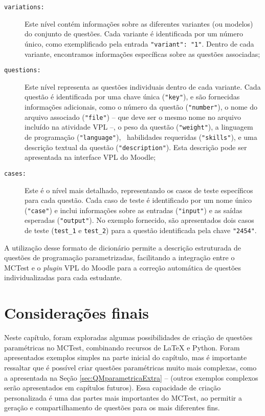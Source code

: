 \begin{description}
\item[\texttt{variations:}]  Este nível contém informações sobre as diferentes variantes (ou modelos) do conjunto de questões. Cada variante é identificada por um número único, como exemplificado pela entrada \verb|"variant": "1"|. Dentro de cada variante, encontramos informações específicas sobre as questões associadas;

\item[\texttt{questions:}] Este nível representa as questões individuais dentro de cada variante. Cada questão é identificada por uma chave única (\verb|"key"|), e são fornecidas informações adicionais, como o número da questão (\verb|"number"|), o nome do arquivo associado (\verb|"file"|) -- que deve ser o mesmo nome no arquivo incluído na atividade VPL --, o peso da questão (\verb|"weight"|), a linguagem de programação (\verb|"language"|), \ habilidades requeridas (\verb|"skills"|), e uma descrição textual da questão (\verb|"description"|). Esta descrição pode ser apresentada na interface VPL do Moodle;

\item[\texttt{cases:}] Este é o nível mais detalhado, representando os casos de teste específicos para cada questão. Cada caso de teste é identificado por um nome único (\verb|"case"|) e inclui informações sobre as entradas (\verb|"input"|) e as saídas esperadas (\verb|"output"|). No exemplo fornecido, são apresentados dois casos de teste (\verb|test_1| e \verb|test_2|) para a questão identificada pela chave \verb|"2454"|.
\end{description}

A utilização desse formato de dicionário permite a descrição estruturada de questões de programação parametrizadas, facilitando a integração entre o MCTest e o \textit{plugin} VPL do Moodle para a correção automática de questões individualizadas para cada estudante.

\section{Considerações finais}

Neste capítulo, foram exploradas algumas possibilidades de criação de questões paramétricas no MCTest, combinando recursos de \LaTeX{} e Python. Foram apresentados exemplos simples na parte inicial do capítulo, mas é importante ressaltar que é possível criar questões paramétricas muito mais complexas, como a apresentada na Seção \ref{sec:QMparametricaExtra} --  (outros exemplos complexos serão apresentados em capítulos futuros). Essa capacidade de criação personalizada é uma das partes mais importantes do MCTest, ao permitir a geração e compartilhamento de questões para os mais diferentes fins.


